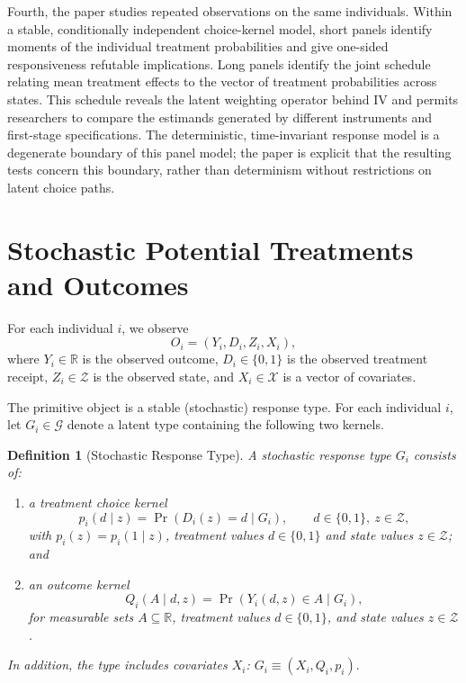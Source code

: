 \documentclass[11pt]{article}
\newtheorem{definition}{Definition}
\newcommand{\R}{\mathbb{R}}
\newcommand{\1}{\mathbf{1}}
\newcommand{\cZ}{\mathcal{Z}}
\newcommand{\cX}{\mathcal{X}}
\newcommand{\cG}{\mathcal{G}}
\begin{document}
Fourth, the paper studies repeated observations on the same individuals. Within a stable, conditionally independent choice-kernel model, short panels identify moments of the individual treatment probabilities and give one-sided responsiveness refutable implications. Long panels identify the joint schedule relating mean treatment effects to the vector of treatment probabilities across states. This schedule reveals the latent weighting operator behind IV and permits researchers to compare the estimands generated by different instruments and first-stage specifications. The deterministic, time-invariant response model is a degenerate boundary of this panel model; the paper is explicit that the resulting tests concern this boundary, rather than determinism without restrictions on latent choice paths.

\section{Stochastic Potential Treatments and Outcomes}
\label{sec:model}

For each individual $i$, we observe
\[
        O_i=(Y_i,D_i,Z_i,X_i),
\]
where $Y_i\in\R$ is the observed outcome, $D_i\in\{0,1\}$ is the observed treatment receipt, $Z_i\in\cZ$ is the observed state, and $X_i\in\cX$ is a vector of covariates.

The primitive object is a stable (stochastic) response type. For each individual $i$, let $G_i\in\cG$ denote a latent type containing the following two kernels.  

\begin{definition}[Stochastic Response Type] \label{def:sttypes}
A stochastic response type $G_i$ consists of:
\begin{enumerate}[label=(\roman*)]
    \item a treatment choice kernel
    \[
        p_i(d\mid z)=\Pr(D_i(z)=d\mid G_i),
        \qquad d\in\{0,1\},\ z\in\cZ,
    \]
    with $p_i(z)=p_i(1\mid z)$, treatment values $d \in \{0, 1\}$ and state values $z \in \cZ$; and
    \item an outcome kernel
    \[
        Q_i(A\mid d,z)=\Pr(Y_i(d,z)\in A\mid G_i),
    \]
    for measurable sets $A\subseteq\R$, treatment values $d\in\{0,1\}$, and state values $z\in\cZ$.
\end{enumerate}
In addition, the type includes covariates $X_i$: $G_i \equiv (X_i, Q_i, p_i).$
\end{definition}
\end{document}
